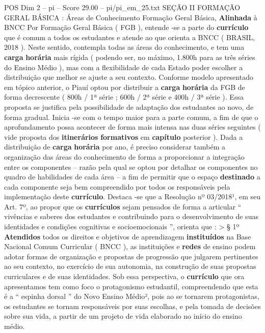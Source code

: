 \begin{textsample}{POS Dim 2 – pi – Score 29.00 – pi/pi\_em\_25.txt}  \label{ex:f2_pos_096}
SEÇÃO II FORMAÇÃO GERAL BÁSICA : Áreas de Conhecimento Formação Geral Básica, \textbf{Alinhada} à BNCC Por Formação Geral Básica ( FGB ), entende -se a parte do \textbf{currículo} que é comum a todos os estudantes e atende ao que orienta a BNCC ( BRASIL, 2018 ).
Neste sentido, contempla todas as áreas do conhecimento, e tem uma \textbf{carga} \textbf{horária} mais rígida ( podendo ser, no máximo, 1.800h para as três séries do Ensino Médio ), mas com a flexibilidade de cada Estado poder escolher a distribuição que melhor se ajuste a seu contexto.
Conforme modelo apresentado em tópico anterior, o Piauí optou por distribuir a \textbf{carga} \textbf{horária} da FGB de forma decrescente ( 800h / 1ª série ; 600h / 2ª série e 400h / 3ª série ).
Essa proposta se justifica pela possibilidade de adaptação dos estudantes ao novo, de forma gradual.
Inicia -se com o tempo maior para a parte comum, a fim de que o aprofundamento possa acontecer de forma mais intensa nas duas séries seguintes ( vide proposta dos \textbf{itinerários} \textbf{formativos} em \textbf{capítulo} posterior ).
Dada a distribuição de \textbf{carga} \textbf{horária} por ano, é preciso considerar também a organização das áreas do conhecimento de forma a proporcionar a integração entre os componentes – razão pela qual se optou por detalhar os componentes no quadro de habilidades de cada área – a fim de permitir que o espaço \textbf{destinado} a cada componente seja bem compreendido por todos os responsáveis pela implementação deste \textbf{currículo}.
Destaca -se que a Resolução nº 03/2018¹, em seu Art. 7º, ao propor que os \textbf{currículos} sejam pensados de forma a articular “ vivências e saberes dos estudantes e contribuindo para o desenvolvimento de suas identidades e condições cognitivas e socioemocionais ”, orienta que : > § 1º \textbf{Atendidos} todos os direitos e objetivos de aprendizagem \textbf{instituídos} na Base Nacional Comum Curricular ( BNCC ), as instituições e \textbf{redes} de ensino podem adotar formas de organização e propostas de progressão que julgarem pertinentes ao seu contexto, no exercício de sua autonomia, na construção de suas propostas curriculares e de suas identidades.
Sob essa perspectiva, o \textbf{currículo} que ora apresentamos tem como foco o protagonismo estudantil, compreendendo que esta é a “ espinha dorsal ” do Novo Ensino Médio², pois ao se tornarem protagonistas, os estudantes se tornam responsáveis por suas escolhas, e pela tomada de decisões sobre sua vida, a partir de um projeto de vida elaborado no início do ensino médio.

\end{textsample}
